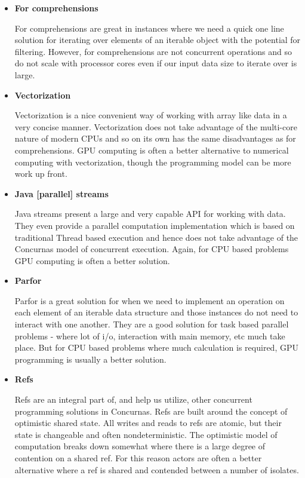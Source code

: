 \documentclass[conc-doc]{subfiles}
\begin{document}
\begin{itemize}
	\item \textbf{For comprehensions}
	
		For comprehensions are great in instances where we need a quick one line solution for iterating over elements of an iterable object with the potential for filtering. However, for comprehensions are not concurrent operations and so do not scale with processor cores even if our input data size to iterate over is large.
		
	\item \textbf{Vectorization}
	
		Vectorization is a nice convenient way of working with array like data in a very concise manner. Vectorization does not take advantage of the multi-core nature of modern CPUs and so on its own has the same disadvantages as for comprehensions. GPU computing is often a better alternative to numerical computing with vectorization, though the programming model can be more work up front.
		
	\item \textbf{Java [parallel] streams}
	
		Java streams present a large and very capable API for working with data. They even provide a parallel computation implementation which is based on traditional Thread based execution and hence does not take advantage of the Concurnas model of concurrent execution. Again, for CPU based problems GPU computing is often a better solution.		
		
	\item \textbf{Parfor}
	
		Parfor is a great solution for when we need to implement an operation on each element of an iterable data structure and those instances do not need to interact with one another. They are a good solution for task based parallel problems - where lot of i/o, interaction with main memory, etc much take place. But for CPU based problems where much calculation is required, GPU programming is usually a better solution.
		
	\item \textbf{Refs}
	
		Refs are an integral part of, and help us utilize, other concurrent programming solutions in Concurnas. Refs are built around the concept of optimistic shared state. All writes and reads to refs are atomic, but their state is changeable and often nondeterministic. The optimistic model of computation breaks down somewhat where there is a large degree of contention on a shared ref. For this reason actors are often a better alternative where a ref is shared and contended between a number of isolates.
		

\end{itemize}
\end{document}
